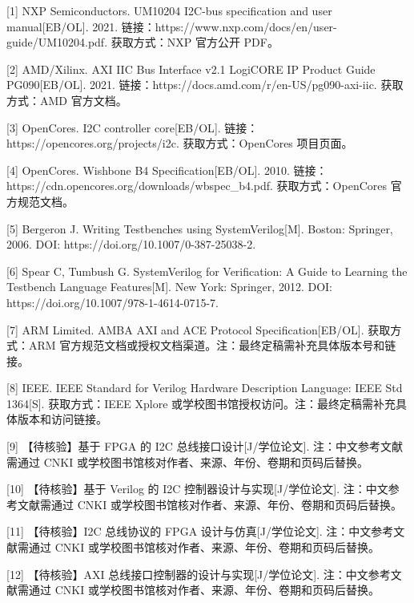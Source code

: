 {[}1{]} NXP Semiconductors. UM10204 I2C-bus specification and user
manual{[}EB/OL{]}. 2021.
链接：https://www.nxp.com/docs/en/user-guide/UM10204.pdf. 获取方式：NXP
官方公开 PDF。

{[}2{]} AMD/Xilinx. AXI IIC Bus Interface v2.1 LogiCORE IP Product Guide
PG090{[}EB/OL{]}. 2021.
链接：https://docs.amd.com/r/en-US/pg090-axi-iic. 获取方式：AMD
官方文档。

{[}3{]} OpenCores. I2C controller core{[}EB/OL{]}.
链接：https://opencores.org/projects/i2c. 获取方式：OpenCores 项目页面。

{[}4{]} OpenCores. Wishbone B4 Specification{[}EB/OL{]}. 2010.
链接：https://cdn.opencores.org/downloads/wbspec\_b4.pdf.
获取方式：OpenCores 官方规范文档。

{[}5{]} Bergeron J. Writing Testbenches using SystemVerilog{[}M{]}.
Boston: Springer, 2006. DOI: https://doi.org/10.1007/0-387-25038-2.

{[}6{]} Spear C, Tumbush G. SystemVerilog for Verification: A Guide to
Learning the Testbench Language Features{[}M{]}. New York: Springer,
2012. DOI: https://doi.org/10.1007/978-1-4614-0715-7.

{[}7{]} ARM Limited. AMBA AXI and ACE Protocol Specification{[}EB/OL{]}.
获取方式：ARM
官方规范文档或授权文档渠道。注：最终定稿需补充具体版本号和链接。

{[}8{]} IEEE. IEEE Standard for Verilog Hardware Description Language:
IEEE Std 1364{[}S{]}. 获取方式：IEEE Xplore
或学校图书馆授权访问。注：最终定稿需补充具体版本和访问链接。

{[}9{]} 【待核验】基于 FPGA 的 I2C 总线接口设计{[}J/学位论文{]}.
注：中文参考文献需通过 CNKI
或学校图书馆核对作者、来源、年份、卷期和页码后替换。

{[}10{]} 【待核验】基于 Verilog 的 I2C 控制器设计与实现{[}J/学位论文{]}.
注：中文参考文献需通过 CNKI
或学校图书馆核对作者、来源、年份、卷期和页码后替换。

{[}11{]} 【待核验】I2C 总线协议的 FPGA 设计与仿真{[}J/学位论文{]}.
注：中文参考文献需通过 CNKI
或学校图书馆核对作者、来源、年份、卷期和页码后替换。

{[}12{]} 【待核验】AXI 总线接口控制器的设计与实现{[}J/学位论文{]}.
注：中文参考文献需通过 CNKI
或学校图书馆核对作者、来源、年份、卷期和页码后替换。
